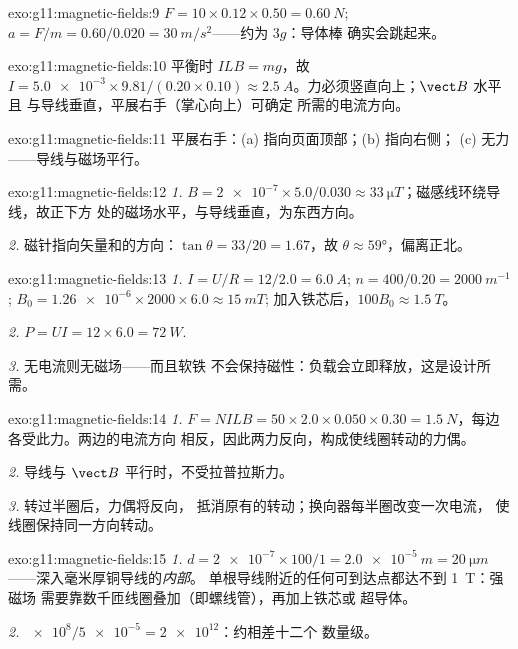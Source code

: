 \begin{solution}{exo:g11:magnetic-fields:9}
$F = 10 \times 0.12 \times 0.50 = \qty{0.60}{N}$;
$a = F/m = 0.60/0.020 = \qty{30}{m/s^2}$——约为 $3g$：导体棒
确实会跳起来。
\end{solution}

\begin{solution}{exo:g11:magnetic-fields:10}
平衡时 $ILB = mg$，故
$I = \num{5.0e-3} \times 9.81 / (0.20 \times 0.10) \approx
\qty{2.5}{A}$。力必须竖直向上；$\vect B$ 水平且
与导线垂直，平展右手（掌心向上）可确定
所需的电流方向。
\end{solution}

\begin{solution}{exo:g11:magnetic-fields:11}
平展右手：(a) 指向页面顶部；(b) 指向右侧；
(c) 无力——导线与磁场平行。
\end{solution}

\begin{solution}{exo:g11:magnetic-fields:12}
\emph{1.} $B = \num{2e-7} \times 5.0 / 0.030 \approx
\qty{33}{\micro T}$；磁感线环绕导线，故正下方
处的磁场水平，与导线垂直，为东西方向。

\emph{2.} 磁针指向矢量和的方向：$\tan\theta = 33/20 =
1.67$，故 $\theta \approx \ang{59}$，偏离正北。
\end{solution}

\begin{solution}{exo:g11:magnetic-fields:13}
\emph{1.} $I = U/R = 12/2.0 = \qty{6.0}{A}$;
$n = 400/0.20 = \qty{2000}{m^{-1}}$;
$B_0 = \num{1.26e-6} \times 2000 \times 6.0 \approx \qty{15}{mT}$;
加入铁芯后，$100 B_0 \approx \qty{1.5}{T}$。

\emph{2.} $P = UI = 12 \times 6.0 = \qty{72}{W}$.

\emph{3.} 无电流则无磁场——而且软铁
不会保持磁性：负载会立即释放，这是设计所需。
\end{solution}

\begin{solution}{exo:g11:magnetic-fields:14}
\emph{1.} $F = NILB = 50 \times 2.0 \times 0.050 \times 0.30 =
\qty{1.5}{N}$，每边各受此力。两边的电流方向
相反，因此两力反向，构成使线圈转动的力偶。

\emph{2.} 导线与 $\vect B$ 平行时，不受拉普拉斯力。

\emph{3.} 转过半圈后，力偶将反向，
抵消原有的转动；换向器每半圈改变一次电流，
使线圈保持同一方向转动。
\end{solution}

\begin{solution}{exo:g11:magnetic-fields:15}
\emph{1.} $d = \num{2e-7} \times 100 / 1 = \qty{2.0e-5}{m} =
\qty{20}{\micro m}$——深入毫米厚铜导线的\emph{内部}。
单根导线附近的任何可到达点都达不到 \qty{1}{T}：强磁场
需要靠数千匝线圈叠加（即螺线管），再加上铁芯或
超导体。

\emph{2.} $\num{e8} / \num{5e-5} = \num{2e12}$：约相差十二个
数量级。
\end{solution}

